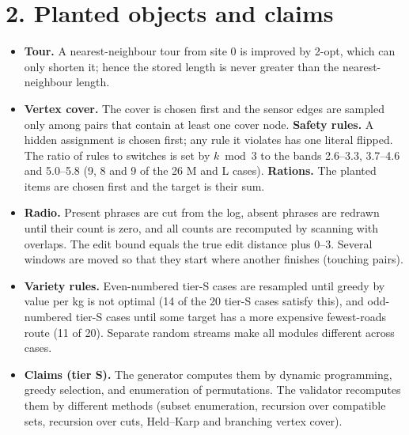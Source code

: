 \section*{2. Planted objects and claims}
\begin{itemize}
\item \textbf{Tour.} A nearest-neighbour tour from site 0 is improved by 2-opt, which can only shorten it; hence the stored length is never greater than the nearest-neighbour length.
\item \textbf{Vertex cover.} The cover is chosen first and the sensor edges are sampled only among pairs that contain at least one cover node. \textbf{Safety rules.} A hidden assignment is chosen first; any rule it violates has one literal flipped. The ratio of rules to switches is set by $k \bmod 3$ to the bands 2.6--3.3, 3.7--4.6 and 5.0--5.8 (9, 8 and 9 of the 26 M and L cases). \textbf{Rations.} The planted items are chosen first and the target is their sum.
\item \textbf{Radio.} Present phrases are cut from the log, absent phrases are redrawn until their count is zero, and all counts are recomputed by scanning with overlaps. The edit bound equals the true edit distance plus 0--3. Several windows are moved so that they start where another finishes (touching pairs).
\item \textbf{Variety rules.} Even-numbered tier-S cases are resampled until greedy by value per kg is not optimal (14 of the 20 tier-S cases satisfy this), and odd-numbered tier-S cases until some target has a more expensive fewest-roads route (11 of 20). Separate random streams make all modules different across cases.
\item \textbf{Claims (tier S).} The generator computes them by dynamic programming, greedy selection, and enumeration of permutations. The validator recomputes them by different methods (subset enumeration, recursion over compatible sets, recursion over cuts, Held--Karp and branching vertex cover).
\end{itemize}
